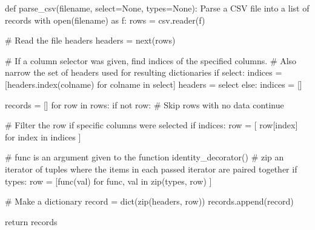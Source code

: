 \documentclass[
  letterpaper,
  DIV=11,
  numbers=noendperiod]{scrreprt}
\newenvironment{Shaded}{\begin{snugshade}}{\end{snugshade}}
\newcommand{\BuiltInTok}[1]{\textcolor[rgb]{0.00,0.46,0.62}{#1}}
\newcommand{\CommentTok}[1]{\textcolor[rgb]{0.37,0.37,0.37}{#1}}
\newcommand{\ControlFlowTok}[1]{\textcolor[rgb]{0.00,0.46,0.62}{#1}}
\newcommand{\ImportTok}[1]{\textcolor[rgb]{0.00,0.46,0.62}{#1}}
\newcommand{\KeywordTok}[1]{\textcolor[rgb]{0.00,0.46,0.62}{#1}}
\newcommand{\NormalTok}[1]{\textcolor[rgb]{0.00,0.46,0.62}{#1}}
\newcommand{\OperatorTok}[1]{\textcolor[rgb]{0.37,0.37,0.37}{#1}}
\newcommand{\VariableTok}[1]{\textcolor[rgb]{0.07,0.07,0.07}{#1}}
\begin{document}
\begin{Shaded}
\begin{Highlighting}[]
\KeywordTok{def}\NormalTok{ parse\_csv(filename, select}\OperatorTok{=}\VariableTok{None}\NormalTok{, types}\OperatorTok{=}\VariableTok{None}\NormalTok{):}
    \CommentTok{\textquotesingle{}\textquotesingle{}\textquotesingle{}}
\CommentTok{    Parse a CSV file into a list of records}
\CommentTok{    \textquotesingle{}\textquotesingle{}\textquotesingle{}}
    \ControlFlowTok{with} \BuiltInTok{open}\NormalTok{(filename) }\ImportTok{as}\NormalTok{ f:}
\NormalTok{        rows }\OperatorTok{=}\NormalTok{ csv.reader(f)}

        \CommentTok{\# Read the file headers}
\NormalTok{        headers }\OperatorTok{=} \BuiltInTok{next}\NormalTok{(rows)}

        \CommentTok{\# If a column selector was given, find indices of the specified columns.}
        \CommentTok{\# Also narrow the set of headers used for resulting dictionaries}
        \ControlFlowTok{if}\NormalTok{ select:}
\NormalTok{            indices }\OperatorTok{=}\NormalTok{ [headers.index(colname) }\ControlFlowTok{for}\NormalTok{ colname }\KeywordTok{in}\NormalTok{ select]}
\NormalTok{            headers }\OperatorTok{=}\NormalTok{ select}
        \ControlFlowTok{else}\NormalTok{:}
\NormalTok{            indices }\OperatorTok{=}\NormalTok{ []}

\NormalTok{        records }\OperatorTok{=}\NormalTok{ []}
        \ControlFlowTok{for}\NormalTok{ row }\KeywordTok{in}\NormalTok{ rows:}
            \ControlFlowTok{if} \KeywordTok{not}\NormalTok{ row:    }\CommentTok{\# Skip rows with no data}
                \ControlFlowTok{continue}
            
            \CommentTok{\# Filter the row if specific columns were selected}
            \ControlFlowTok{if}\NormalTok{ indices:}
\NormalTok{                row }\OperatorTok{=}\NormalTok{ [ row[index] }\ControlFlowTok{for}\NormalTok{ index }\KeywordTok{in}\NormalTok{ indices ]}
            
            \CommentTok{\# func is an argument given to the function \textasciigrave{}identity\_decorator()\textasciigrave{}}
            \CommentTok{\# zip an iterator of tuples where the items in each passed iterator are paired together}
            \ControlFlowTok{if}\NormalTok{ types:}
\NormalTok{                row }\OperatorTok{=}\NormalTok{ [func(val) }\ControlFlowTok{for}\NormalTok{ func, val }\KeywordTok{in} \BuiltInTok{zip}\NormalTok{(types, row) ]}

            \CommentTok{\# Make a dictionary}
\NormalTok{            record }\OperatorTok{=} \BuiltInTok{dict}\NormalTok{(}\BuiltInTok{zip}\NormalTok{(headers, row))}
\NormalTok{            records.append(record)}

    \ControlFlowTok{return}\NormalTok{ records}
\end{Highlighting}
\end{Shaded}
\end{document}
